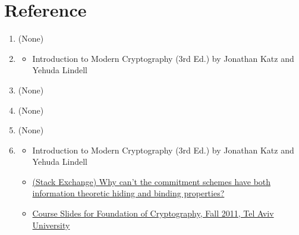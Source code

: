 


\clearpage
{}


\clearpage
{}


\clearpage
{}


\clearpage
{}


\clearpage
{}








\clearpage
\section*{Reference}
\begin{enumerate}
    \item[P1] (None)
    \item[P2] \begin{itemize}
        \item Introduction to Modern Cryptography (3rd Ed.) by Jonathan Katz and Yehuda Lindell
    \end{itemize}
    \item[P3] (None)
    \item[P4] (None)
    \item[P5] (None)
    \item[P6] \begin{itemize}
        \item Introduction to Modern Cryptography (3rd Ed.) by Jonathan Katz and Yehuda Lindell
        \item \href{https://crypto.stackexchange.com/a/68048}{(Stack Exchange) Why can't the commitment schemes have both information theoretic hiding and binding properties?}
        \item \href{https://iftachh.github.io/MyHomepage/Courses/FOC/Fall11/Slides/Commitments.pdf}{Course Slides for Foundation of Cryptography, Fall 2011, Tel Aviv University}
    \end{itemize}
\end{enumerate}